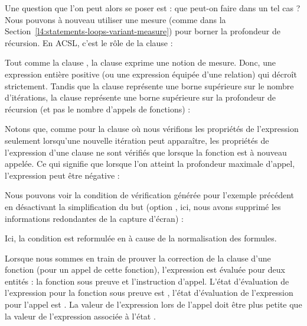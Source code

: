 Une question que l'on peut alors se poser est : que peut-on faire dans un tel
cas ? Nous pouvons à nouveau utiliser une mesure (comme dans la
Section~\ref{l4:statements-loops-variant-measure}) pour borner la profondeur de
récursion. En ACSL, c'est le rôle de la clause  :




Tout comme la clause , la clause 
exprime une notion de mesure. Donc, une expression entière positive (ou une
expression équipée d'une relation) qui décroît strictement. Tandis que la clause
 représente une borne supérieure sur le nombre
d'itérations, la clause  représente une borne supérieure
sur la profondeur de récursion (et pas le nombre d'appels de fonctions) :




Notons que, comme pour la clause  où nous vérifions les
propriétés de l'expression seulement lorsqu'une nouvelle itération peut
apparaître, les propriétés de l'expression d'une clause 
ne sont vérifiés que lorsque la fonction est à nouveau appelée. Ce qui signifie
que lorsque l'on atteint la profondeur maximale d'appel, l'expression peut être
négative :




Nous pouvons voir la condition de vérification générée pour l'exemple précédent
en désactivant la simplification du but (option , ici,
nous avons supprimé les informations redondantes de la capture d'écran) :




Ici, la condition  est reformulée en
 à cause de la normalisation des formules.


Lorsque nous sommes en train de prouver la correction de la clause
 d'une fonction (pour un appel de cette fonction),
l'expression est évaluée pour deux entités : la fonction sous preuve et
l'instruction d'appel. L'état d'évaluation de l'expression pour la fonction
sous preuve est , l'état d'évaluation de l'expression pour
l'appel est . La valeur de l'expression lors de l'appel doit
être plus petite que la valeur de l'expression associée à l'état .


